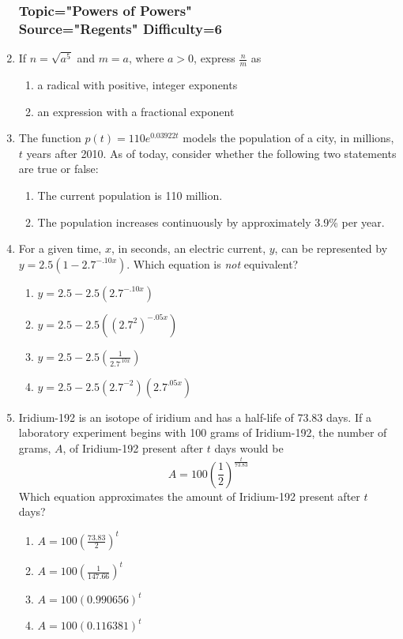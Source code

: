 \documentclass[12pt, oneside]{article}
\begin{document}
\begin{enumerate}
\subsubsection*{Topic="Powers of Powers"\\
Source="Regents" 
Difficulty=6}

\item If $n=\sqrt{a^5}$ and $m=a$, where $a > 0$, express $\frac{n}{m}$ as 
\begin{enumerate}
    \item a radical with positive, integer exponents
    \item an expression with a fractional exponent
\end{enumerate}

\item The function $p(t)=110e^{0.03922t}$ models the population of a city, in millions, $t$ years after 2010. As of today, consider whether the following two statements are true or false:
\begin{enumerate}
    \item The current population is 110 million.
    \item The population increases continuously by approximately 3.9\% per year.
\end{enumerate} %

\item For a given time, $x$, in seconds, an electric current, $y$, can be represented by $y = 2.5(1 - 2.7^{-.10x})$. Which equation is \emph{not} equivalent?
\begin{enumerate}
    \item $y = 2.5 - 2.5 (2.7^{-.10x})$
    \item $y = 2.5 - 2.5 ((2.7^2)^{-.05x})$
    \item $\displaystyle y = 2.5 - 2.5 \left( \frac{1}{2.7^{.10x}} \right)$
    \item $y = 2.5 - 2.5 (2.7^{-2})(2.7^{.05x})$
\end{enumerate}

\item Iridium-192 is an isotope of iridium and has a half-life of 73.83 days. If a laboratory experiment begins with 100 grams of Iridium-192, the number of grams, $A$, of Iridium-192 present after $t$ days would be 
\[A=100 \left( \frac{1}{2} \right)^\frac{t}{73.83}\]
Which equation approximates the amount of Iridium-192 present after $t$ days?
\begin{enumerate}
    \item $\displaystyle A=100 \left( \frac{73.83}{2} \right)^t$
    \item $\displaystyle A=100 \left( \frac{1}{147.66} \right)^t$
    \item $A=100  (0.990656)^t$
    \item $A=100 (0.116381)^t$
\end{enumerate}


\end{enumerate}
\end{document}
